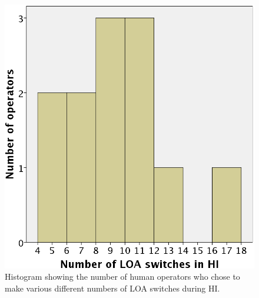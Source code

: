 \documentclass[a4paper,12pt,oneside,openright]{bhamthesis}
\begin{document}
\begin{figure}
	\centering
	\includegraphics[width=0.49\columnwidth]{chapter5_fig/histogram_loa_hi_exp3.png}
	\caption{Histogram showing the number of human operators who chose to make various different numbers of LOA switches during HI.} 
	\label{fig:histogram_hi_exp3}
\end{figure}
\end{document}
